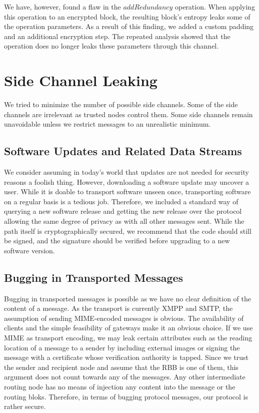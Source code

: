 We have, however, found a flaw in the $addRedundancy$ operation. When applying this operation to an encrypted block, the resulting block's entropy leaks some of the operation parameters. As a result of this finding, we added a custom padding and an additional encryption step. The repeated analysis showed that the operation does no longer leaks these parameters through this channel.

\section{Side Channel Leaking}
We tried to minimize the number of possible side channels. Some of the side channels are irrelevant as trusted nodes control them. Some side channels remain unavoidable unless we restrict messages to an unrealistic minimum. 

\subsection{Software Updates and Related Data Streams}
We consider assuming in today's world that updates are not needed for security reasons a foolish thing. However, downloading a software update may uncover a user. While it is doable to transport software unseen once, transporting software on a regular basis is a tedious job. Therefore, we included a standard way of querying a new software release and getting the new release over the \MessageVortex{} protocol allowing the same degree of privacy as with all other messages sent. While the path itself is cryptographically secured, we recommend that the code should still be signed, and the signature should be verified before upgrading to a new software version.

\subsection{Bugging in Transported Messages}
Bugging in transported messages is possible as we have no clear definition of the content of a message. As the transport is currently XMPP and SMTP, the assumption of sending MIME-encoded messages is obvious. The availability of clients and the simple feasibility of gateways make it an obvious choice. If we use MIME as transport encoding, we may leak certain attributes such as the reading location of a message to a sender by including external images or signing the message with a certificate whose verification authority is tapped. Since we trust the sender and recipient node and assume that the RBB is one of them, this argument does not count towards any of the messages. Any other intermediate routing node has no means of injection any content into the message or the routing bloks. Therefore, in terms of bugging protocol messages, our protocol is rather secure.

